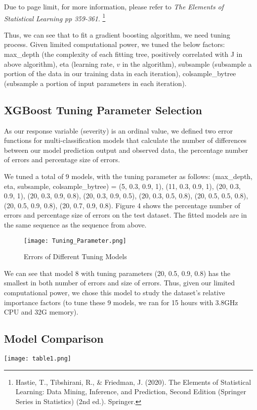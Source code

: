 \documentclass[twocolumn]{article}
\begin{document}
Due to page limit, for more information, please refer to \textit{The Elements of Statistical Learning pp 359-361.} \footnote{Hastie, T., Tibshirani, R., \& Friedman, J. (2020). The Elements of Statistical Learning: Data Mining, Inference, and Prediction, Second Edition (Springer Series in Statistics) (2nd ed.). Springer.}

Thus, we can see that to fit a gradient boosting algorithm, we need tuning process. Given limited computational power, we tuned the below factors: max\_depth (the complexity of each fitting tree, positively correlated with J in above algorithm), eta (learning rate, $\textit{v}$ in the algorithm), subsample (subsample a portion of the data in our training data in each iteration), colsample\_bytree (subsample a portion of input parameters in each iteration). 


\subsection{XGBoost Tuning Parameter Selection}
As our response variable (severity) is an ordinal value, we defined two error functions for multi-classification models that calculate the number of differences between our model prediction output and observed data, the percentage number of errors and percentage size of errors.

We tuned a total of 9 models, with the tuning parameter as follows: (max\_depth, eta, subsample, colsample\_bytree) = (5, 0.3, 0.9, 1), (11, 0.3, 0.9, 1), (20, 0.3, 0.9, 1), (20, 0.3, 0.9, 0.8), (20, 0.3, 0.9, 0.5), (20, 0.3, 0.5, 0.8), (20, 0.5, 0.5, 0.8), (20, 0.5, 0.9, 0.8), (20, 0.7, 0.9, 0.8). Figure 4 shows the percentage number of errors and percentage size of errors on the test dataset. The fitted models are in the same sequence as the sequence from above. 

\begin{figure}[h]
    \centering
    \texttt{[image: Tuning\_Parameter.png]}
    \caption{Errors of Different Tuning Models}
\end{figure}

We can see that model 8 with tuning parameters (20, 0.5, 0.9, 0.8) has the smallest in both number of errors and size of errors. Thus, given our limited computational power, we chose this model to study the dataset’s relative importance factors (to tune these 9 models, we ran for 15 hours with 3.8GHz CPU and 32G memory). 

\subsection{Model Comparison}
\begin{table}[h]
    \centering
    \texttt{[image: table1.png]}
    \caption{}
\end{table}
\end{document}
